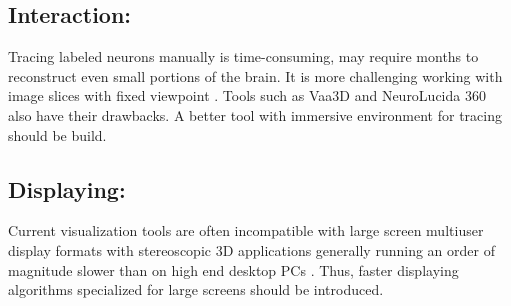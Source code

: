 \documentclass[10pt,twocolumn,letterpaper]{article}
\begin{document}
\subsection{Interaction:}Tracing labeled neurons manually is time-consuming, may require months to reconstruct even small portions of the brain. It is more challenging working with image slices with fixed viewpoint \cite{Usher2018}. Tools such as Vaa3D and NeuroLucida 360 also have their drawbacks. A better tool with immersive environment for tracing should be build.
\subsection{Displaying:}Current visualization tools are often incompatible with large screen multiuser display formats with stereoscopic 3D applications generally running an order of magnitude slower than on high end desktop PCs \cite{Wiebrands2018}. Thus, faster displaying algorithms specialized for large screens should be introduced. 

{\small


}
\end{document}
